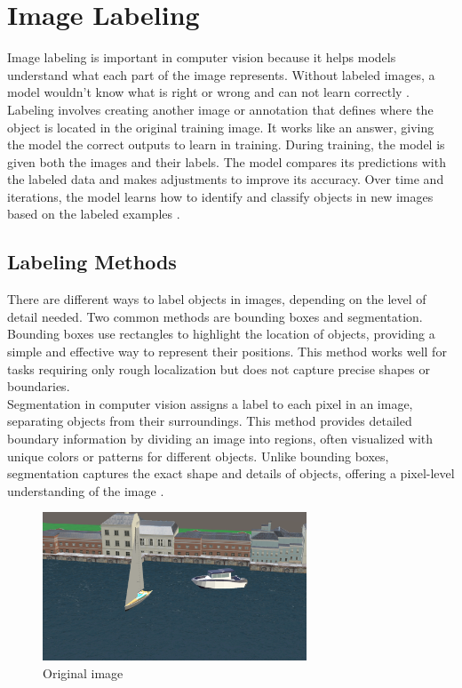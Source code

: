 \section{Image Labeling}
Image labeling is important in computer vision because it helps models understand what each part of the image represents. Without labeled images, a model wouldn’t know what is right or wrong and can not learn correctly \cite{Labelling}.\\

\noindent Labeling involves creating another image or annotation that defines where the object is located in the original training image. It works like an answer, giving the model the correct outputs to learn in training. During training, the model is given both the images and their labels. The model compares its predictions with the labeled data and makes adjustments to improve its accuracy. Over time and iterations, the model learns how to identify and classify objects in new images based on the labeled examples \cite{Labelling}.

\subsection{Labeling Methods}

There are different ways to label objects in images, depending on the level of detail needed. Two common methods are bounding boxes and segmentation.\\

\noindent Bounding boxes use rectangles to highlight the location of objects, providing a simple and effective way to represent their positions. This method works well for tasks requiring only rough localization but does not capture precise shapes or boundaries.\\

\noindent Segmentation in computer vision assigns a label to each pixel in an image, separating objects from their surroundings. This method provides detailed boundary information by dividing an image into regions, often visualized with unique colors or patterns for different objects. Unlike bounding boxes, segmentation captures the exact shape and details of objects, offering a pixel-level understanding of the image \cite{labelingMethods}.

\begin{figure}[H]
    \centering
    \includegraphics[width=0.7\textwidth]{Figures/rgb_2.png}
    \caption{Original image}
    \label{fig:image1}
\end{figure}

